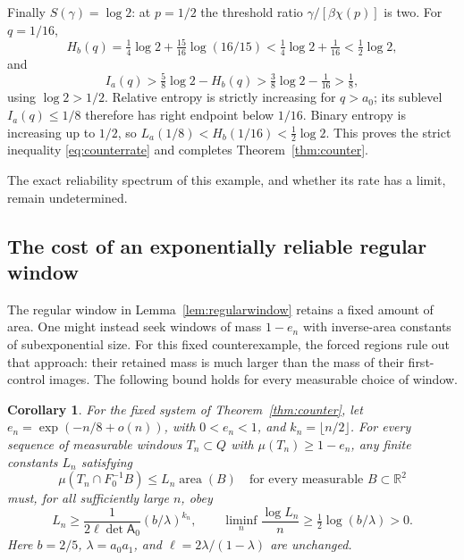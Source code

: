 \documentclass[11pt]{amsart}
\newtheorem{corollary}[theorem]{Corollary}
\theoremstyle{definition}
\theoremstyle{remark}
\newcommand{\R}{\mathbb R}
\newcommand{\area}{\operatorname{area}}
\numberwithin{equation}{section}
\begin{document}
Finally $S(\gamma)=\log2$: at $p=1/2$ the threshold ratio
$\gamma/[\beta\chi(p)]$ is two. For $q=1/16$,
\[
H_b(q)=\tfrac14\log2+\tfrac{15}{16}\log(16/15)
 <\tfrac14\log2+\tfrac1{16}<\tfrac12\log2,
\]
and
\[
I_a(q)>\tfrac58\log2-H_b(q)
 >\tfrac38\log2-\tfrac1{16}>\tfrac18,
\]
using $\log2>1/2$. Relative entropy is strictly increasing for
$q>a_0$; its sublevel $I_a(q)\le1/8$ therefore has right endpoint
below $1/16$. Binary entropy is increasing up to $1/2$, so
$L_a(1/8)<H_b(1/16)<\tfrac12\log2$.
This proves the strict inequality \eqref{eq:counterrate} and completes
Theorem~\ref{thm:counter}.

The exact reliability spectrum of this example, and whether its rate has a limit, remain
undetermined.

\subsection{The cost of an exponentially reliable regular window}
The regular window in Lemma~\ref{lem:regularwindow} retains a fixed
amount of area. One might instead seek windows of mass $1-e_n$ with
inverse-area constants of subexponential size. For this fixed
counterexample, the forced regions rule out that approach: their
retained mass is much larger than the mass of their first-control
images. The following bound holds for every measurable choice of window.
\begin{corollary}\label{cor:inversecost}
For the fixed system of Theorem~\ref{thm:counter}, let
$e_n=\exp(-n/8+o(n))$, with $0<e_n<1$, and
$k_n=\lfloor n/2\rfloor$. For every sequence of measurable
windows $T_n\subset Q$ with $\mu(T_n)\ge1-e_n$, any finite
constants $L_n$ satisfying
\begin{equation}\label{eq:windowinverse}
\mu(T_n\cap F_0^{-1}B)\le L_n\area(B)
       \quad\text{for every measurable }B\subset\R^2
\end{equation}
must, for all sufficiently large $n$, obey
\begin{equation}\label{eq:inversegrowth}
L_n\ge\frac{1}{2\ell\det\mathsf A_0}
              (b/\lambda)^{k_n},\qquad
\liminf_n\frac{\log L_n}{n}
              \ge\tfrac12\log(b/\lambda)>0.
\end{equation}
Here $b=2/5$, $\lambda=a_0a_1$, and
$\ell=2\lambda/(1-\lambda)$ are unchanged.
\end{corollary}
\end{document}
